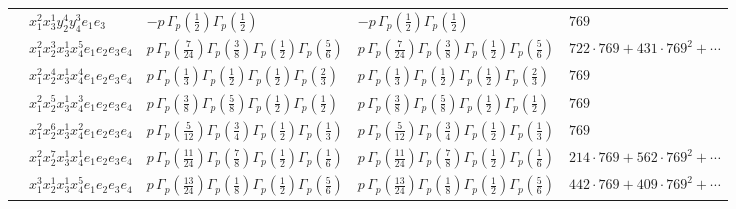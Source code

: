 \documentclass[11pt]{article}
\begin{document}
\begin{table}[ht]
{\begin{tabular}{@{}lllll@{}}
 & $x_{1}^{2} x_{3}^{1} y_{2}^{4} y_{4}^{3} e_{1} e_{3}$ & $- p \, \Gamma_p \left( \frac{1}{2} \right) \Gamma_p \left( \frac{1}{2} \right)$ & $- p \, \Gamma_p \left( \frac{1}{2} \right) \Gamma_p \left( \frac{1}{2} \right)$ & $769$ \\
 & $x_{1}^{2} x_{2}^{3} x_{3}^{1} x_{4}^{5}  e_{1} e_{2} e_{3} e_{4}$ & $p \, \Gamma_p \left( \frac{7}{24} \right) \Gamma_p \left( \frac{3}{8} \right) \Gamma_p \left( \frac{1}{2} \right) \Gamma_p \left( \frac{5}{6} \right)$ & $p \, \Gamma_p \left( \frac{7}{24} \right) \Gamma_p \left( \frac{3}{8} \right) \Gamma_p \left( \frac{1}{2} \right) \Gamma_p \left( \frac{5}{6} \right)$ & $722{\cdot}769{+}431{\cdot}769^{2}{+}\cdots$ \\
 & $x_{1}^{2} x_{2}^{4} x_{3}^{1} x_{4}^{4}  e_{1} e_{2} e_{3} e_{4}$ & $p \, \Gamma_p \left( \frac{1}{3} \right) \Gamma_p \left( \frac{1}{2} \right) \Gamma_p \left( \frac{1}{2} \right) \Gamma_p \left( \frac{2}{3} \right)$ & $p \, \Gamma_p \left( \frac{1}{3} \right) \Gamma_p \left( \frac{1}{2} \right) \Gamma_p \left( \frac{1}{2} \right) \Gamma_p \left( \frac{2}{3} \right)$ & $769$ \\
 & $x_{1}^{2} x_{2}^{5} x_{3}^{1} x_{4}^{3}  e_{1} e_{2} e_{3} e_{4}$ & $p \, \Gamma_p \left( \frac{3}{8} \right) \Gamma_p \left( \frac{5}{8} \right) \Gamma_p \left( \frac{1}{2} \right) \Gamma_p \left( \frac{1}{2} \right)$ & $p \, \Gamma_p \left( \frac{3}{8} \right) \Gamma_p \left( \frac{5}{8} \right) \Gamma_p \left( \frac{1}{2} \right) \Gamma_p \left( \frac{1}{2} \right)$ & $769$ \\
 & $x_{1}^{2} x_{2}^{6} x_{3}^{1} x_{4}^{2}  e_{1} e_{2} e_{3} e_{4}$ & $p \, \Gamma_p \left( \frac{5}{12} \right) \Gamma_p \left( \frac{3}{4} \right) \Gamma_p \left( \frac{1}{2} \right) \Gamma_p \left( \frac{1}{3} \right)$ & $p \, \Gamma_p \left( \frac{5}{12} \right) \Gamma_p \left( \frac{3}{4} \right) \Gamma_p \left( \frac{1}{2} \right) \Gamma_p \left( \frac{1}{3} \right)$ & $769$ \\
 & $x_{1}^{2} x_{2}^{7} x_{3}^{1} x_{4}^{1}  e_{1} e_{2} e_{3} e_{4}$ & $p \, \Gamma_p \left( \frac{11}{24} \right) \Gamma_p \left( \frac{7}{8} \right) \Gamma_p \left( \frac{1}{2} \right) \Gamma_p \left( \frac{1}{6} \right)$ & $p \, \Gamma_p \left( \frac{11}{24} \right) \Gamma_p \left( \frac{7}{8} \right) \Gamma_p \left( \frac{1}{2} \right) \Gamma_p \left( \frac{1}{6} \right)$ & $214{\cdot}769{+}562{\cdot}769^{2}{+}\cdots$ \\
 & $x_{1}^{3} x_{2}^{1} x_{3}^{1} x_{4}^{5}  e_{1} e_{2} e_{3} e_{4}$ & $p \, \Gamma_p \left( \frac{13}{24} \right) \Gamma_p \left( \frac{1}{8} \right) \Gamma_p \left( \frac{1}{2} \right) \Gamma_p \left( \frac{5}{6} \right)$ & $p \, \Gamma_p \left( \frac{13}{24} \right) \Gamma_p \left( \frac{1}{8} \right) \Gamma_p \left( \frac{1}{2} \right) \Gamma_p \left( \frac{5}{6} \right)$ & $442{\cdot}769{+}409{\cdot}769^{2}{+}\cdots$ \\

\end{tabular}}
\end{table}
\end{document}
